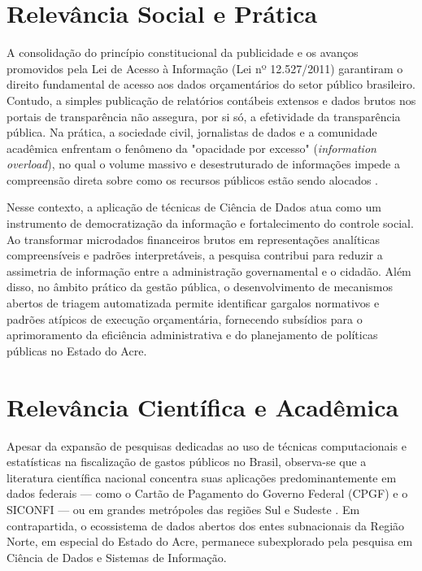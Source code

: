 \documentclass[
    12pt,               %
    openright,          %
    oneside,            %
    a4paper,            %
    chapter=TITLE,      %
    sumario=tradicional,%
    english,            %
    brazilian,          %
 ]{abntex2}
\begin{document}
\section{Relevância Social e Prática}\label{sec:relevancia_social}

A consolidação do princípio constitucional da publicidade e os avanços promovidos pela Lei de Acesso à Informação (Lei nº 12.527/2011) garantiram o direito fundamental de acesso aos dados orçamentários do setor público brasileiro. Contudo, a simples publicação de relatórios contábeis extensos e dados brutos nos portais de transparência não assegura, por si só, a efetividade da transparência pública. Na prática, a sociedade civil, jornalistas de dados e a comunidade acadêmica enfrentam o fenômeno da "opacidade por excesso" (\textit{information overload}), no qual o volume massivo e desestruturado de informações impede a compreensão direta sobre como os recursos públicos estão sendo alocados \cite{cavalcanti2014, pereira2025}.

Nesse contexto, a aplicação de técnicas de Ciência de Dados atua como um instrumento de democratização da informação e fortalecimento do controle social. Ao transformar microdados financeiros brutos em representações analíticas compreensíveis e padrões interpretáveis, a pesquisa contribui para reduzir a assimetria de informação entre a administração governamental e o cidadão. Além disso, no âmbito prático da gestão pública, o desenvolvimento de mecanismos abertos de triagem automatizada permite identificar gargalos normativos e padrões atípicos de execução orçamentária, fornecendo subsídios para o aprimoramento da eficiência administrativa e do planejamento de políticas públicas no Estado do Acre.

\section{Relevância Científica e Acadêmica}\label{sec:relevancia_cientifica}

Apesar da expansão de pesquisas dedicadas ao uso de técnicas computacionais e estatísticas na fiscalização de gastos públicos no Brasil, observa-se que a literatura científica nacional concentra suas aplicações predominantemente em dados federais — como o Cartão de Pagamento do Governo Federal (CPGF) e o SICONFI — ou em grandes metrópoles das regiões Sul e Sudeste \cite{cavalcanti2014, nunes2021}. Em contrapartida, o ecossistema de dados abertos dos entes subnacionais da Região Norte, em especial do Estado do Acre, permanece subexplorado pela pesquisa em Ciência de Dados e Sistemas de Informação.
\end{document}
